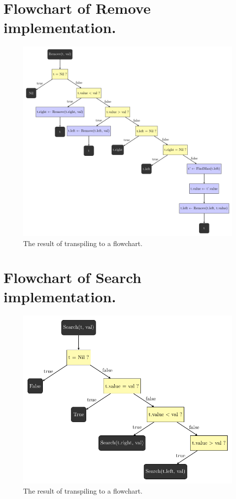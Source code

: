 \section{Flowchart of Remove implementation.}
\label{Flowchart of Remove implementation.}

\begin{figure}[ht!]
    \centering
    \includegraphics[scale=.6]{assets/chapter6/bst/Remove_ibp.pdf}
    \caption{The result of transpiling  to a flowchart.}
    \label{removeIBP}
\end{figure}

\section{Flowchart of Search implementation.}
\label{Flowchart of Search implementation.}

\begin{figure}[ht!]
    \centering
    \includegraphics[scale=.6]{assets/chapter6/bst/Search_ibp.pdf}
    \caption{The result of transpiling  to a flowchart.}
    \label{searchIBP}
\end{figure}

